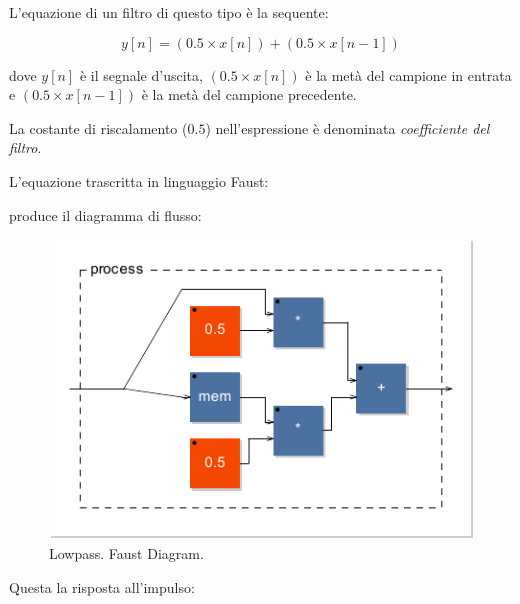 L'equazione di un filtro di questo tipo è la sequente:

\begin{equation}
  \label{lowpass}
  y[n] = (0.5 \times x[n]) + (0.5 \times x[n-1])
\end{equation}

dove $y[n]$ è il segnale d'uscita, $(0.5 \times x[n])$ è la metà del campione in
entrata e $(0.5 \times x[n-1])$ è la metà del campione precedente.

La costante di riscalamento ($0.5$) nell'espressione è denominata \emph{coefficiente
del filtro}.

L'equazione trascritta in linguaggio Faust:



produce il diagramma di flusso:

\begin{figure}[ht]
  \centering
  \includegraphics[]{CAPITOLI/0500/CODES/lowpass-svg/process}
  \caption{Lowpass. Faust Diagram.}
  \label{fdlowpass}
\end{figure}

Questa la risposta all'impulso:


